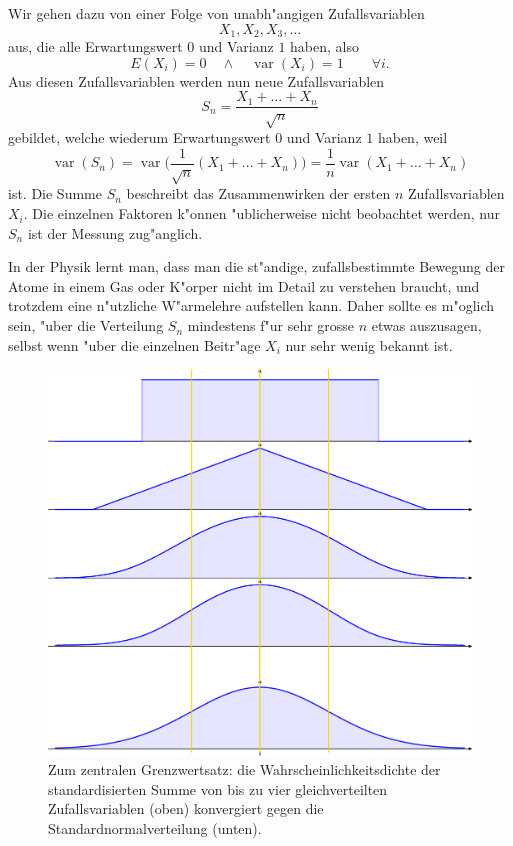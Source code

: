 Wir gehen dazu von einer Folge von unabh"angigen Zufallsvariablen
\[
X_1,X_2,X_3,\dots
\]
aus, die alle Erwartungswert $0$ und Varianz $1$ haben, also
\[
E(X_i)=0\quad\wedge\quad\operatorname{var}(X_i)=1\qquad\forall i.
\]
Aus diesen Zufallsvariablen werden nun neue Zufallsvariablen
\[
S_n=\frac{X_1+\dots+X_n}{\sqrt{n}}
\]
gebildet, welche wiederum Erwartungswert $0$ und Varianz $1$ haben,
weil
\[
\operatorname{var}(S_n)=\operatorname{var}\bigl(\frac1{\sqrt{n}}(X_1+\dots+X_n)\big)
=\frac1n\operatorname{var}(X_1+\dots+X_n)
\]
ist. Die Summe $S_n$ beschreibt das Zusammenwirken der ersten $n$
Zufallsvariablen $X_i$. Die einzelnen Faktoren k"onnen "ublicherweise
nicht beobachtet werden, nur $S_n$ ist der Messung zug"anglich.

In der Physik lernt man, dass man die st"andige, zufallsbestimmte
Bewegung der Atome in einem Gas oder K"orper nicht im Detail
zu verstehen braucht, und trotzdem eine n"utzliche W"armelehre
aufstellen kann. Daher sollte es m"oglich sein, "uber die Verteilung
$S_n$ mindestens f"ur sehr grosse $n$ etwas auszusagen, selbst
wenn "uber die einzelnen Beitr"age $X_i$ nur sehr wenig bekannt ist.
\begin{figure}
\begin{center}
\includegraphics[width=\hsize]{images/verteilungsfunktion-10}
\end{center}
\caption{Zum zentralen Grenzwertsatz: die Wahrscheinlichkeitsdichte
der standardisierten Summe von bis zu vier 
gleichverteilten Zufallsvariablen (oben)
konvergiert gegen die Standardnormalverteilung (unten).\label{zgws}}
\end{figure}

